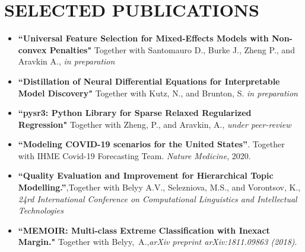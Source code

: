 \documentclass[11pt,a4paper,roman]{moderncv}        %
\begin{document}
\section{SELECTED PUBLICATIONS}
\vspace{0.3em}   	
 
 \begin{itemize}
 		\item \textbf{``Universal Feature Selection for Mixed-Effects Models with Non-convex Penalties"} \newline Together with Santomauro D., Burke J., Zheng P., and Aravkin A., \emph{in preparation}
 		\item \textbf{``Distillation of Neural Differential Equations for Interpretable Model Discovery"} \newline
 			 Together with Kutz, N., and Brunton, S. \emph{in preparation}
 		\item \textbf{``pysr3: Python Library for Sparse Relaxed Regularized Regression"} \newline
 			 Together with Zheng, P., and Aravkin, A., \emph{under peer-review}
        \item \textbf{``Modeling COVID-19 scenarios for the United States''}. \newline Together with IHME Covid-19 Forecasting Team. \emph{Nature Medicine}, 2020.
        \item \textbf{``Quality Evaluation and Improvement for Hierarchical Topic Modelling.''},\newline Together with Belyy A.V., Selezniova, M.S., and Vorontsov, K., \newline \emph{ 24rd International Conference on Computational Linguistics and Intellectual Technologies} 
        \item  \textbf{``MEMOIR: Multi-class Extreme Classification with Inexact Margin."} \newline Together with Belyy,~A.,\textit{arXiv preprint arXiv:1811.09863 (2018)}.
    \end{itemize}


%


\end{document}

